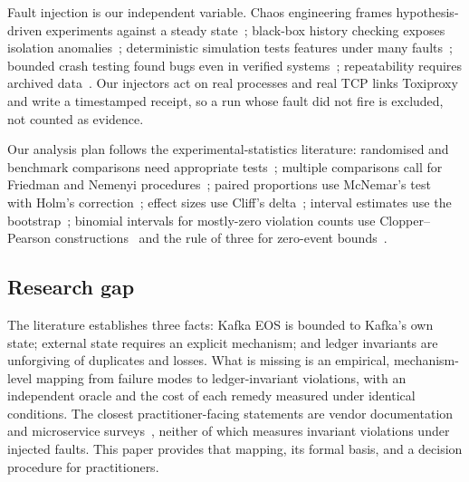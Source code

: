 Fault injection is our independent variable. Chaos engineering frames hypothesis-driven
experiments against a steady state~\cite{basiri2016}; black-box history checking exposes
isolation anomalies~\cite{elle2020}; deterministic simulation tests features under many
faults~\cite{fdb2021}; bounded crash testing found bugs even in verified
systems~\cite{crashmonkey2019}; repeatability requires archived data~\cite{collberg2016}. Our
injectors act on real processes and real TCP links Toxiproxy and write a
timestamped receipt, so a run whose fault did not fire is excluded, not counted as evidence.

Our analysis plan follows the experimental-statistics literature: randomised and benchmark
comparisons need appropriate tests~\cite{arcuri2011,arcuri2012}; multiple comparisons call
for Friedman and Nemenyi procedures~\cite{demsar2006}; paired proportions use McNemar's
test~\cite{mcnemar1947} with Holm's correction~\cite{holland1987}; effect sizes use
Cliff's delta~\cite{cliff1993}; interval estimates use the bootstrap~\cite{efron1979};
binomial intervals for mostly-zero violation counts use Clopper--Pearson
constructions~\cite{jsta2014,brown2001} and the rule of three for zero-event
bounds~\cite{rule3}.

\subsection{Research gap}
\label{sec:rel-gap}

The literature establishes three facts: Kafka EOS is bounded to Kafka's own state; external
state requires an explicit mechanism; and ledger invariants are unforgiving of duplicates
and losses. What is missing is an empirical, mechanism-level mapping from failure modes to
ledger-invariant violations, with an independent oracle and the cost of each remedy measured
under identical conditions. The closest practitioner-facing statements are vendor
documentation~\cite{kafka-design,debezium-outbox,stripe-idempotency} and microservice
surveys~\cite{laigner2021,micro2026}, neither of which measures invariant violations under
injected faults. This paper provides that mapping, its formal basis, and a decision
procedure for practitioners.
